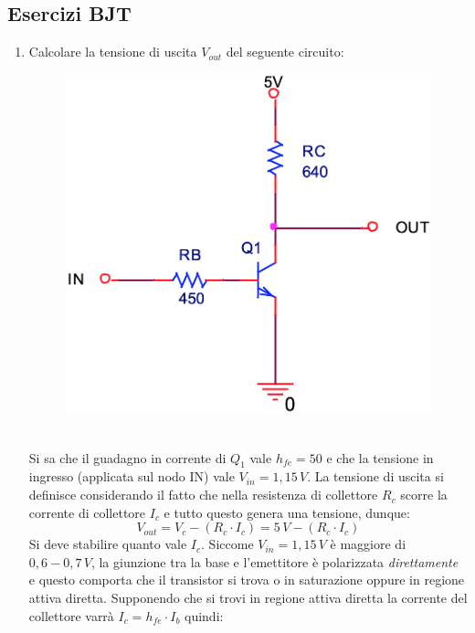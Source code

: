\documentclass[12pt, a4paper]{report}
\begin{document}
\begin{appendices}
\chapter{Esercizi BJT}
\begin{enumerate}
    \item Calcolare la tensione di uscita $V_{out}$ del seguente circuito:
    \begin{figure}[h]
        \centering
       \includegraphics[scale=0.3,angle=0]{bjt_es1.png}
    \end{figure}
    \\Si sa che il guadagno in corrente di $Q_1$ vale $h_{fe} = 50$ e che la tensione in ingresso (applicata sul nodo IN) vale $V_{in} = 1,15\,V$. La tensione di uscita si definisce considerando il fatto che nella resistenza di collettore $R_{c}$ scorre la corrente di collettore $I_{c}$ e tutto questo genera una tensione, dunque:
    \begin{equation*}
        V_{out} = V_{c} - (R_{c} \cdot I_{c}) = 5\,V - (R_{c} \cdot I_{c})
    \end{equation*}
    Si deve stabilire quanto vale $I_{c}$. Siccome $V_{in} = 1,15\,V$  è maggiore di $0,6 - 0,7\,V$, la giunzione tra la base e l'emettitore è polarizzata \textit{direttamente} e questo comporta che il transistor si trova o in saturazione oppure in regione attiva diretta. Supponendo che si trovi in regione attiva diretta la corrente del collettore varrà $I_{c} = h_{fe} \cdot I_{b}$ quindi:

\end{enumerate}
\end{appendices}
\end{document}
